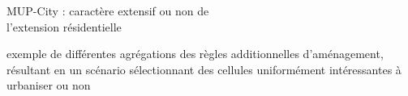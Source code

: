 \documentclass[xcolor=table]{beamer}
\begin{document}

\begin{frame}{MUP-City : caractère extensif ou non de \\l'extension résidentielle}
\vspace{1cm}
\hspace*{-0.5cm}

{\footnotesize exemple de différentes agrégations des règles additionnelles d'aménagement, résultant en un scénario sélectionnant des cellules uniformément intéressantes à urbaniser ou non}
\end{frame}
\end{document}
